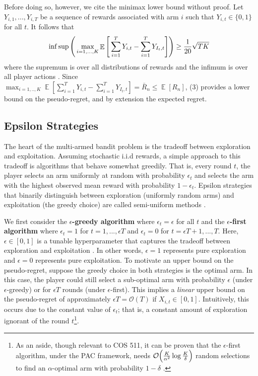 \documentclass[12pt]{article}
\DeclareMathOperator*{\E}{\mathbb{E}}
\begin{document}
Before doing so, however, we cite the minimax lower bound without proof. Let $Y_{i,1},...,Y_{i,T}$ be a sequence of rewards associated with arm $i$ such that $Y_{i,t}\in\{0,1\}$ for all $t$. It follows that
\begin{align}
\inf\sup\Bigg{(}\max_{i=1,...,K}\E\Bigg{[}\sum_{i=1}^{T}Y_{i,t}-\sum_{i=1}^{T}Y_{I_{t},t}\Bigg{]}\Bigg{)}\geq\frac{1}{20}\sqrt{TK}
\end{align}
where the supremum is over all distributions of rewards and the infimum is over all player actions \cite{bubeck2012}. Since $\max_{i=1,..,K}\E[\sum_{i=1}^{T}Y_{i,t}-\sum_{i=1}^{T}Y_{I_{t},t}]=\bar{R}_{n}\leq\E[R_{n}]$, (3) provides a lower bound on the pseudo-regret, and by extension the expected regret.

\subsection{Epsilon Strategies}

The heart of the multi-armed bandit problem is the tradeoff between exploration and exploitation. Assuming stochastic i.i.d rewards, a simple approach to this tradeoff is algorithms that behave somewhat greedily. That is, every round $t$, the player selects an arm uniformly at random with probability $\epsilon_{t}$ and selects the arm with the highest observed mean reward with probability $1-\epsilon_{t}$. Epsilon strategies that binarily distinguish between exploration (uniformly random arms) and exploitation (the greedy choice) are called semi-uniform methods \cite{mohri2005}.

We first consider the \textbf{$\epsilon$-greedy algorithm} where $\epsilon_{t}=\epsilon$ for all $t$ and the \textbf{$\epsilon$-first algorithm} where $\epsilon_{t}=1$ for $t=1,...,\epsilon T$ and $\epsilon_{t}=0$ for $t=\epsilon T+1,...,T$. Here, $\epsilon\in[0,1]$ is a tunable hyperparameter that captures the tradeoff between exploration and exploitation \cite{sutton1998}. In other words, $\epsilon=1$ represents pure exploration and $\epsilon=0$ represents pure exploitation. To motivate an upper bound on the pseudo-regret, suppose the greedy choice in both strategies is the optimal arm. In this case, the player could still select a sub-optimal arm with probability $\epsilon$ (under $\epsilon$-greedy) or for $\epsilon T$ rounds (under $\epsilon$-first). This implies a \textit{linear} upper bound on the pseudo-regret of approximately $\epsilon T=\mathcal{O}(T)$ if $X_{i,t}\in[0,1]$. Intuitively, this occurs due to the constant value of $\epsilon_{t}$; that is, a constant amount of exploration ignorant of the round $t$\footnote{As an aside, though relevant to COS 511, it can be proven that the $\epsilon$-first algorithm, under the PAC framework, needs $\mathcal{O}\Big{(}\frac{K}{\alpha^{2}}\log\frac{K}{\delta}\Big{)}$ random selections to find an $\alpha$-optimal arm with probability $1-\delta$ \cite{evendar2002}.}.
\end{document}
